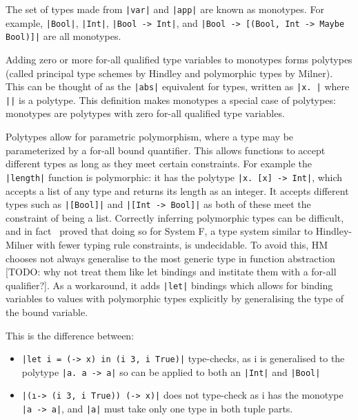 \documentclass[a4paper,fleqn,12pt]{article}
\begin{document}
The set of types made from \texttt{|var|} and \texttt{|app|} are known as monotypes. For example, \texttt{|Bool|}, \texttt{|Int|}, \texttt{|Bool -> Int|}, and \texttt{|Bool -> [(Bool, Int -> Maybe Bool)]|} are all monotypes.

Adding zero or more for-all qualified type variables to monotypes forms polytypes (called principal type schemes by Hindley and polymorphic types by Milner). This can be thought of as the \texttt{|abs|} equivalent for types, written as \texttt{|\forall x. \rho|} where \texttt{|\rho|} is a polytype. This definition makes monotypes a special case of polytypes: monotypes are polytypes with zero for-all qualified type variables.

Polytypes allow for parametric polymorphism, where a type may be parameterized by a for-all bound quantifier. This allows functions to accept different types as long as they meet certain constraints. For example the \texttt{|length|} function is polymorphic: it has the polytype \texttt{|\forall x. [x] -> Int|}, which accepts a list of any type and returns its length as an integer. It accepts different types such as \texttt{|[Bool]|} and \texttt{|[Int -> Bool]|} as both of these meet the constraint of being a list.
Correctly inferring polymorphic types can be difficult, and in fact~\cite{ref13} proved that doing so for System F, a type system similar to Hindley-Milner with fewer typing rule constraints, is undecidable. To avoid this, HM chooses not always generalise to the most generic type in function abstraction [TODO: why not treat them like let bindings and institate them with a for-all qualifier?]. As a workaround, it adds \texttt{|let|} bindings which allows for binding variables to values with polymorphic types explicitly by generalising the type of the bound variable.

This is the difference between:
\begin{itemize}
  \item \texttt{|let i = (\x -> x) in (i 3, i True)|} type-checks, as i is generalised to the polytype \texttt{|\forall a. a -> a|} so can be applied to both an \texttt{|Int|} and \texttt{|Bool|}
  \item \texttt{|(\i -> (i 3, i True)) (\x -> x)|} does not type-check as i has the monotype \texttt{|a -> a|}, and \texttt{|a|} must take only one type in both tuple parts.
\end{itemize}
\end{document}
